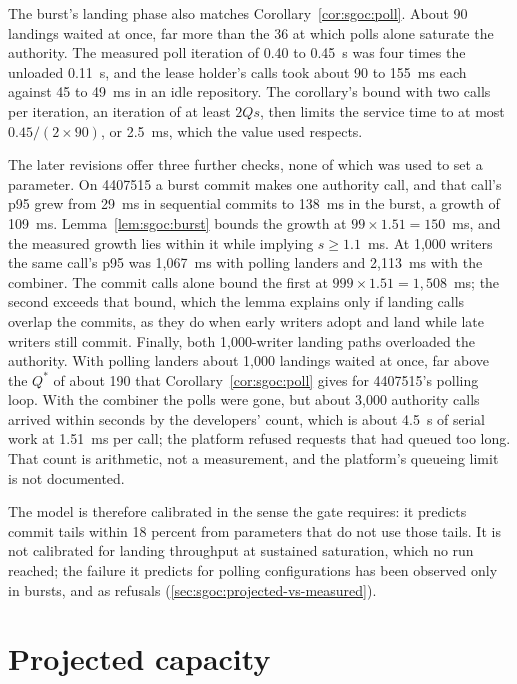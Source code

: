 \documentclass[11pt,letterpaper]{article}
\theoremstyle{definition}
\theoremstyle{remark}
\begin{document}
The burst's landing phase also matches Corollary~\ref{cor:sgoc:poll}. About 90 landings waited at once, far more than the 36 at which polls alone saturate the authority. The measured poll iteration of 0.40 to 0.45~s was four times the unloaded 0.11~s, and the lease holder's calls took about 90 to 155~ms each against 45 to 49~ms in an idle repository. %
The corollary's bound with two calls per iteration, an iteration of at least $2Qs$, then limits the service time to at most $0.45/(2 \times 90)$, or 2.5~ms, which the value used respects.

The later revisions offer three further checks, none of which was used to set a parameter. On 4407515 a burst commit makes one authority call, and that call's p95 grew from 29~ms in sequential commits to 138~ms in the burst, a growth of 109~ms. %
Lemma~\ref{lem:sgoc:burst} bounds the growth at $99 \times 1.51 = 150$~ms, and the measured growth lies within it while implying $s \ge 1.1$~ms. At 1,000 writers the same call's p95 was 1,067~ms with polling landers and 2,113~ms with the combiner. %
The commit calls alone bound the first at $999 \times 1.51 = 1{,}508$~ms; the second exceeds that bound, which the lemma explains only if landing calls overlap the commits, as they do when early writers adopt and land while late writers still commit. Finally, both 1,000-writer landing paths overloaded the authority. With polling landers about 1,000 landings waited at once, far above the $Q^{*}$ of about 190 that Corollary~\ref{cor:sgoc:poll} gives for 4407515's polling loop. %
With the combiner the polls were gone, but about 3,000 authority calls arrived within seconds by the developers' count, which is about 4.5~s of serial work at 1.51~ms per call; the platform refused requests that had queued too long. %
That count is arithmetic, not a measurement, and the platform's queueing limit is not documented.

The model is therefore calibrated in the sense the gate requires: it predicts commit tails within 18 percent from parameters that do not use those tails. It is not calibrated for landing throughput at sustained saturation, which no run reached; the failure it predicts for polling configurations has been observed only in bursts, and as refusals (\cref{sec:sgoc:projected-vs-measured}).

\section{Projected capacity}
\label{sec:sgoc:projected}
\end{document}
